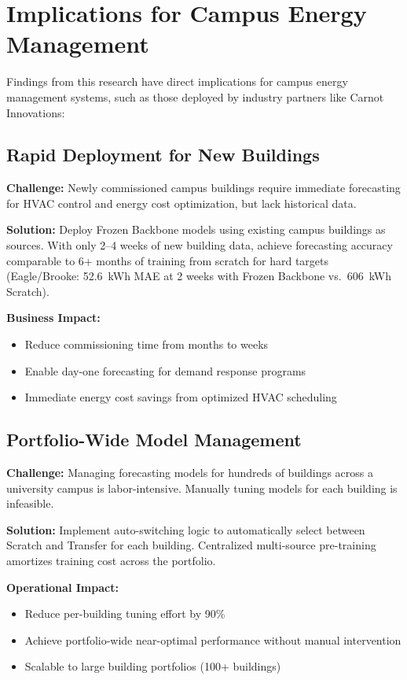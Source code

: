 \documentclass[12pt,a4paper]{report}
\begin{document}
\section{Implications for Campus Energy Management}

Findings from this research have direct implications for campus energy management systems, such as those deployed by industry partners like Carnot Innovations:

\subsection{Rapid Deployment for New Buildings}

\textbf{Challenge:} Newly commissioned campus buildings require immediate forecasting for HVAC control and energy cost optimization, but lack historical data.

\textbf{Solution:} Deploy Frozen Backbone models using existing campus buildings as sources. With only 2--4 weeks of new building data, achieve forecasting accuracy comparable to 6+ months of training from scratch for hard targets (Eagle/Brooke: 52.6~kWh MAE at 2 weeks with Frozen Backbone vs.\ 606~kWh Scratch).

\textbf{Business Impact:}
\begin{itemize}
    \item Reduce commissioning time from months to weeks
    \item Enable day-one forecasting for demand response programs
    \item Immediate energy cost savings from optimized HVAC scheduling
\end{itemize}

\subsection{Portfolio-Wide Model Management}

\textbf{Challenge:} Managing forecasting models for hundreds of buildings across a university campus is labor-intensive. Manually tuning models for each building is infeasible.

\textbf{Solution:} Implement auto-switching logic to automatically select between Scratch and Transfer for each building. Centralized multi-source pre-training amortizes training cost across the portfolio.

\textbf{Operational Impact:}
\begin{itemize}
    \item Reduce per-building tuning effort by 90\%
    \item Achieve portfolio-wide near-optimal performance without manual intervention
    \item Scalable to large building portfolios (100+ buildings)
\end{itemize}
\end{document}
